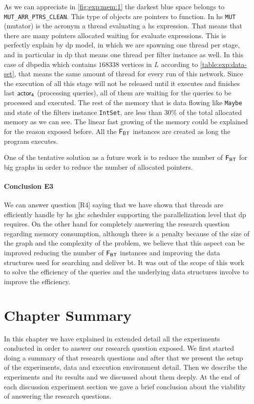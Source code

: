 As we can appreciate in \autoref{fig:exp:mem:1} the darkest blue space belongs to \texttt{MUT_ARR_PTRS_CLEAN}.
This type of objects are pointers to function. In \acrlong{hs} \texttt{MUT} (mutator) is the acronym a thread evaluating a \acrshort{hs} expression.
That means that there are many pointers allocated waiting for evaluate expressions. This is perfectly explain by \acrshort{dp} model, in which we are spawning one
thread per stage, and in particular in \acrshort{dp} that means one thread per filter instance as well. In this case of \acrshort{dbpedia} which contains $168338$ vertices in 
$L$ according to \autoref{table:exp:data-set}, that means the same amount of thread for every run of this network. Since the execution of all this stage will not be 
released until it executes and finishes last $\mathsf{actor_4}$ (processing queries), all of them are waiting for the queries to be processed and executed.
The rest of the memory that is data flowing like \texttt{Maybe} and state of the filters instance \texttt{IntSet}, are less than $30\%$ of the 
total allocated memory as we can see. The linear fast growing of the memory could be explained for the reason exposed before. All the $\mathsf{F_{BT}}$ instances are created as long
the program executes.

One of the tentative solution as a future work is to reduce the number of $\mathsf{F_{BT}}$ for big graphs in order to reduce the number 
of allocated pointers.

\paragraph{Conclusion E3} We can answer question [R4] saying that we have shown that threads are efficiently handle by \acrshort{hs} \acrshort{ghc} scheduler supporting the 
parallelization level that \acrshort{dp} requires. On the other hand for completely answering the research question regarding memory consumption, although there is a penalty 
because of the size of the graph and the complexity of the problem, we believe that this aspect can be improved reducing the number of $\mathsf{F_{BT}}$ instances and improving the data structures
used for searching and deliver \acrshort{bt}. It was out of the scope of this work to solve the efficiency of the queries and the underlying data structures involve to improve the efficiency. 

\section{Chapter Summary}
In this chapter we have explained in extended detail all the experiments conducted in order to answer our research question exposed.
We first started doing a summary of that research questions and after that we present the setup of the experiments, data and execution environment detail.
Then we describe the experiments and its results and we discussed about them deeply. At the end of each discussion experiment section we gave
a brief conclusion about the viability of answering the research questions.
